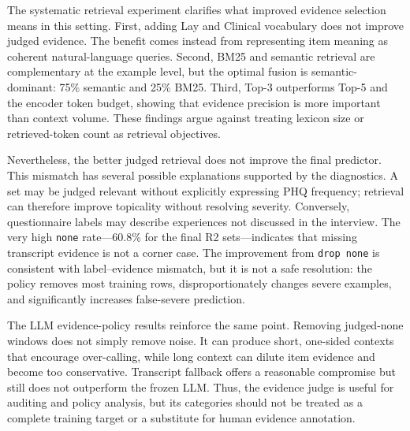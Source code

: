 \documentclass{article}
\begin{document}
The systematic retrieval experiment clarifies what improved evidence selection means in this setting. First, adding Lay and Clinical vocabulary does not improve judged evidence. The benefit comes instead from representing item meaning as coherent natural-language queries. Second, BM25 and semantic retrieval are complementary at the example level, but the optimal fusion is semantic-dominant: 75\% semantic and 25\% BM25. Third, Top-3 outperforms Top-5 and the encoder token budget, showing that evidence precision is more important than context volume. These findings argue against treating lexicon size or retrieved-token count as retrieval objectives.

Nevertheless, the better judged retrieval does not improve the final predictor. This mismatch has several possible explanations supported by the diagnostics. A set may be judged relevant without explicitly expressing PHQ frequency; retrieval can therefore improve topicality without resolving severity. Conversely, questionnaire labels may describe experiences not discussed in the interview. The very high \texttt{none} rate---60.8\% for the final R2 sets---indicates that missing transcript evidence is not a corner case. The improvement from \texttt{drop none} is consistent with label--evidence mismatch, but it is not a safe resolution: the policy removes most training rows, disproportionately changes severe examples, and significantly increases false-severe prediction.

The LLM evidence-policy results reinforce the same point. Removing judged-none windows does not simply remove noise. It can produce short, one-sided contexts that encourage over-calling, while long context can dilute item evidence and become too conservative. Transcript fallback offers a reasonable compromise but still does not outperform the frozen LLM. Thus, the evidence judge is useful for auditing and policy analysis, but its categories should not be treated as a complete training target or a substitute for human evidence annotation.
\end{document}
